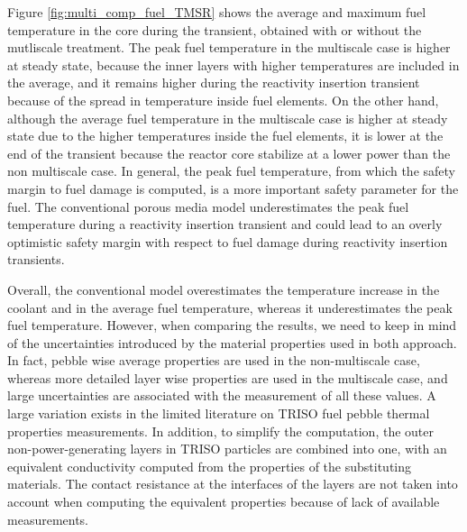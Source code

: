 \documentclass{elsarticle}
\begin{document}
Figure \ref{fig:multi_comp_fuel_TMSR} shows the average and maximum fuel temperature in the core during the transient, obtained with or without the mutliscale treatment. 
The peak fuel temperature in the multiscale case is higher at steady state, because the inner layers with higher temperatures are included in the average, and it remains higher during the reactivity insertion transient because of the spread in temperature inside fuel elements. On the other hand, although the average fuel temperature in the multiscale case is higher at steady state due to the higher temperatures inside the fuel elements, it is lower at the end of the transient because the reactor core stabilize at a lower power than the non multiscale case. In general, the peak fuel temperature, from which the safety margin to fuel damage is computed, is a more important safety parameter for the fuel. The conventional porous media model underestimates the peak fuel temperature during a reactivity insertion transient and could lead to an overly optimistic safety margin with respect to fuel damage during reactivity insertion transients. 

Overall, the conventional model overestimates the temperature increase in the coolant and in the average fuel temperature, whereas it underestimates the peak fuel temperature. However, when comparing the results, we need to keep in mind of the uncertainties introduced by the material properties used in both approach. In fact, pebble wise average properties are used in the non-multiscale case, whereas more detailed layer wise properties are used in the multiscale case, and large uncertainties are associated with the measurement of all these values. A large variation exists in the limited literature on TRISO fuel pebble thermal properties measurements. In addition, to simplify the computation, the outer non-power-generating layers in TRISO particles are combined into one, with an equivalent conductivity computed from the properties of the substituting materials. 
The contact resistance at the interfaces of the layers are not taken into account when computing the equivalent properties because of lack of available measurements. 
\end{document}
